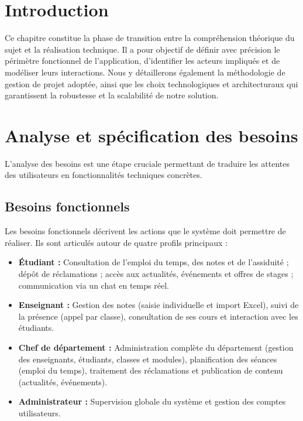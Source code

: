 \section{Introduction}
Ce chapitre constitue la phase de transition entre la compréhension théorique du sujet et la réalisation technique. Il a pour objectif de définir avec précision le périmètre fonctionnel de l'application, d'identifier les acteurs impliqués et de modéliser leurs interactions. Nous y détaillerons également la méthodologie de gestion de projet adoptée, ainsi que les choix technologiques et architecturaux qui garantissent la robustesse et la scalabilité de notre solution.

\section{Analyse et spécification des besoins}
L'analyse des besoins est une étape cruciale permettant de traduire les attentes des utilisateurs en fonctionnalités techniques concrètes.

\subsection{Besoins fonctionnels}
Les besoins fonctionnels décrivent les actions que le système doit permettre de réaliser. Ils sont articulés autour de quatre profils principaux :
\begin{itemize}
    \item \textbf{Étudiant :} Consultation de l'emploi du temps, des notes et de l'assiduité ; dépôt de réclamations ; accès aux actualités, événements et offres de stages ; communication via un chat en temps réel.
    \item \textbf{Enseignant :} Gestion des notes (saisie individuelle et import Excel), suivi de la présence (appel par classe), consultation de ses cours et interaction avec les étudiants.
    \item \textbf{Chef de département :} Administration complète du département (gestion des enseignants, étudiants, classes et modules), planification des séances (emploi du temps), traitement des réclamations et publication de contenu (actualités, événements).
    \item \textbf{Administrateur :} Supervision globale du système et gestion des comptes utilisateurs.
\end{itemize}


